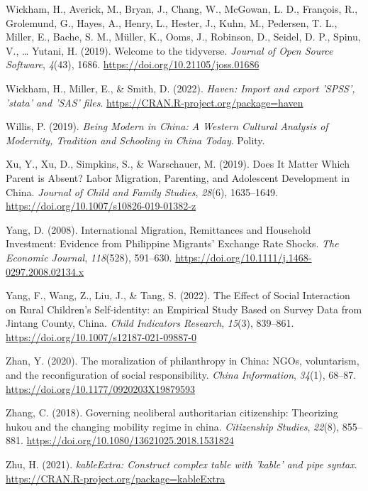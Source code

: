 \documentclass[
  man,floatsintext]{apa7}
\newlength{\cslhangindent}
\newlength{\cslentryspacingunit} %
\newenvironment{CSLReferences}[2] %
 {%
  \setlength{\parindent}{0pt}
  \ifodd #1
  \let\oldpar\par
  \def\par{\hangindent=\cslhangindent\oldpar}
  \fi
  \setlength{\parskip}{#2\cslentryspacingunit}
 }%
 {}
\begin{document}
\begin{CSLReferences}{1}{0}
\leavevmode{}%
Wickham, H., Averick, M., Bryan, J., Chang, W., McGowan, L. D., François, R., Grolemund, G., Hayes, A., Henry, L., Hester, J., Kuhn, M., Pedersen, T. L., Miller, E., Bache, S. M., Müller, K., Ooms, J., Robinson, D., Seidel, D. P., Spinu, V., \ldots{} Yutani, H. (2019). Welcome to the {tidyverse}. \emph{Journal of Open Source Software}, \emph{4}(43), 1686. \url{https://doi.org/10.21105/joss.01686}

\leavevmode{}%
Wickham, H., Miller, E., \& Smith, D. (2022). \emph{Haven: Import and export 'SPSS', 'stata' and 'SAS' files}. \url{https://CRAN.R-project.org/package=haven}

\leavevmode{}%
Willis, P. (2019). \emph{Being Modern in China: A Western Cultural Analysis of Modernity, Tradition and Schooling in China Today}. Polity.

\leavevmode{}%
Xu, Y., Xu, D., Simpkins, S., \& Warschauer, M. (2019). Does It Matter Which Parent is Absent? Labor Migration, Parenting, and Adolescent Development in China. \emph{Journal of Child and Family Studies}, \emph{28}(6), 1635--1649. \url{https://doi.org/10.1007/s10826-019-01382-z}

\leavevmode{}%
Yang, D. (2008). International Migration, Remittances and Household Investment: Evidence from Philippine Migrants{'} Exchange Rate Shocks. \emph{The Economic Journal}, \emph{118}(528), 591--630. \url{https://doi.org/10.1111/j.1468-0297.2008.02134.x}

\leavevmode{}%
Yang, F., Wang, Z., Liu, J., \& Tang, S. (2022). The Effect of Social Interaction on Rural Children{'}s Self-identity: an Empirical Study Based on Survey Data from Jintang County, China. \emph{Child Indicators Research}, \emph{15}(3), 839--861. \url{https://doi.org/10.1007/s12187-021-09887-0}

\leavevmode{}%
Zhan, Y. (2020). The moralization of philanthropy in China: NGOs, voluntarism, and the reconfiguration of social responsibility. \emph{China Information}, \emph{34}(1), 68--87. \url{https://doi.org/10.1177/0920203X19879593}

\leavevmode{}%
Zhang, C. (2018). Governing neoliberal authoritarian citizenship: Theorizing hukou and the changing mobility regime in china. \emph{Citizenship Studies}, \emph{22}(8), 855--881. \url{https://doi.org/10.1080/13621025.2018.1531824}

\leavevmode{}%
Zhu, H. (2021). \emph{kableExtra: Construct complex table with 'kable' and pipe syntax}. \url{https://CRAN.R-project.org/package=kableExtra}

\end{CSLReferences}
\end{document}
